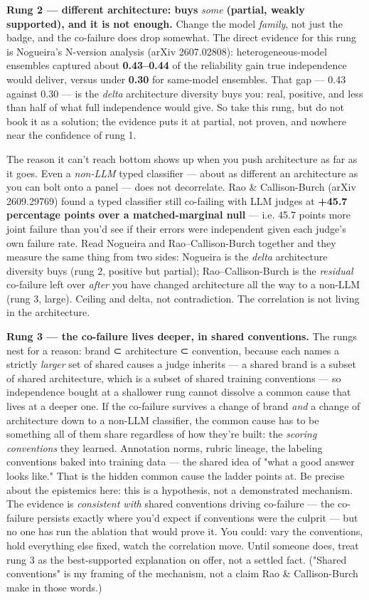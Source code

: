 \documentclass[11pt]{article}
\begin{document}
\textbf{Rung 2 — different architecture: buys} \emph{some} \textbf{(partial, weakly supported), and it is not enough.} Change the model \emph{family}, not just the badge, and the co-failure does drop somewhat. The direct evidence for this rung is Nogueira's N-version analysis (arXiv 2607.02808): heterogeneous-model ensembles captured about \textbf{0.43–0.44} of the reliability gain true independence would deliver, versus under \textbf{0.30} for same-model ensembles. That gap — 0.43 against 0.30 — is the \emph{delta} architecture diversity buys you: real, positive, and less than half of what full independence would give. So take this rung, but do not book it as a solution; the evidence puts it at partial, not proven, and nowhere near the confidence of rung 1.

The reason it can't reach bottom shows up when you push architecture as far as it goes. Even a \emph{non-LLM} typed classifier — about as different an architecture as you can bolt onto a panel — does not decorrelate. Rao \& Callison-Burch (arXiv 2609.29769) found a typed classifier still co-failing with LLM judges at \textbf{+45.7 percentage points over a matched-marginal null} — i.e. 45.7 points more joint failure than you'd see if their errors were independent given each judge's own failure rate.
Read Nogueira and Rao–Callison-Burch together and they measure the same thing from two sides: Nogueira is the \emph{delta} architecture diversity buys (rung 2, positive but partial); Rao–Callison-Burch is the \emph{residual} co-failure left over \emph{after} you have changed architecture all the way to a non-LLM (rung 3, large). Ceiling and delta, not contradiction. The correlation is not living in the architecture.

\textbf{Rung 3 — the co-failure lives deeper, in shared conventions.} The rungs nest for a reason: brand ⊂ architecture ⊂ convention, because each names a strictly \emph{larger} set of shared causes a judge inherits — a shared brand is a subset of shared architecture, which is a subset of shared training conventions — so independence bought at a shallower rung cannot dissolve a common cause that lives at a deeper one. If the co-failure survives a change of brand \emph{and} a change of architecture down to a non-LLM classifier, the common cause has to be something all of them share regardless of how they're built: the \emph{scoring conventions} they learned. Annotation norms, rubric lineage, the labeling conventions baked into training data — the shared idea of "what a good answer looks like." That is the hidden common cause the ladder points at. Be precise about the epistemics here: this is a hypothesis, not a demonstrated mechanism. The evidence is \emph{consistent with} shared conventions driving co-failure — the co-failure persists exactly where you'd expect if conventions were the culprit — but no one has run the ablation that would prove it. You could: vary the conventions, hold everything else fixed, watch the correlation move. Until someone does, treat rung 3 as the best-supported explanation on offer, not a settled fact. ("Shared conventions" is my framing of the mechanism, not a claim Rao \& Callison-Burch make in those words.)
\end{document}
